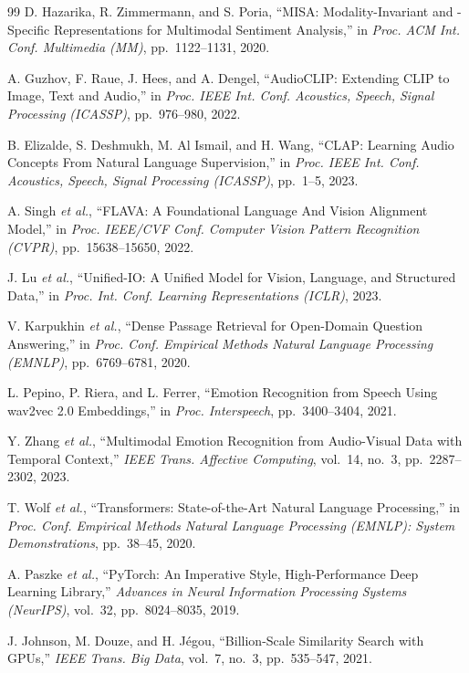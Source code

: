 \documentclass[10pt,conference]{IEEEtran}
\theoremstyle{ieeethm}
\theoremstyle{ieeedef}
\theoremstyle{ieeeremark}
\begin{document}
\begin{thebibliography}{99}
D. Hazarika, R. Zimmermann, and S. Poria,
``MISA: Modality-Invariant and -Specific Representations for Multimodal Sentiment Analysis,''
in \textit{Proc. ACM Int. Conf. Multimedia (MM)}, pp.~1122--1131, 2020.

A. Guzhov, F. Raue, J. Hees, and A. Dengel,
``AudioCLIP: Extending CLIP to Image, Text and Audio,''
in \textit{Proc. IEEE Int. Conf. Acoustics, Speech, Signal Processing (ICASSP)}, pp.~976--980, 2022.

B. Elizalde, S. Deshmukh, M. Al Ismail, and H. Wang,
``CLAP: Learning Audio Concepts From Natural Language Supervision,''
in \textit{Proc. IEEE Int. Conf. Acoustics, Speech, Signal Processing (ICASSP)}, pp.~1--5, 2023.

A. Singh \textit{et al.},
``FLAVA: A Foundational Language And Vision Alignment Model,''
in \textit{Proc. IEEE/CVF Conf. Computer Vision Pattern Recognition (CVPR)}, pp.~15638--15650, 2022.

J. Lu \textit{et al.},
``Unified-IO: A Unified Model for Vision, Language, and Structured Data,''
in \textit{Proc. Int. Conf. Learning Representations (ICLR)}, 2023.

V. Karpukhin \textit{et al.},
``Dense Passage Retrieval for Open-Domain Question Answering,''
in \textit{Proc. Conf. Empirical Methods Natural Language Processing (EMNLP)}, pp.~6769--6781, 2020.

L. Pepino, P. Riera, and L. Ferrer,
``Emotion Recognition from Speech Using wav2vec 2.0 Embeddings,''
in \textit{Proc. Interspeech}, pp.~3400--3404, 2021.

Y. Zhang \textit{et al.},
``Multimodal Emotion Recognition from Audio-Visual Data with Temporal Context,''
\textit{IEEE Trans. Affective Computing}, vol.~14, no.~3, pp.~2287--2302, 2023.

T. Wolf \textit{et al.},
``Transformers: State-of-the-Art Natural Language Processing,''
in \textit{Proc. Conf. Empirical Methods Natural Language Processing (EMNLP): System Demonstrations}, pp.~38--45, 2020.

A. Paszke \textit{et al.},
``PyTorch: An Imperative Style, High-Performance Deep Learning Library,''
\textit{Advances in Neural Information Processing Systems (NeurIPS)}, vol.~32, pp.~8024--8035, 2019.

J. Johnson, M. Douze, and H. Jégou,
``Billion-Scale Similarity Search with GPUs,''
\textit{IEEE Trans. Big Data}, vol.~7, no.~3, pp.~535--547, 2021.

\end{thebibliography}
\end{document}
